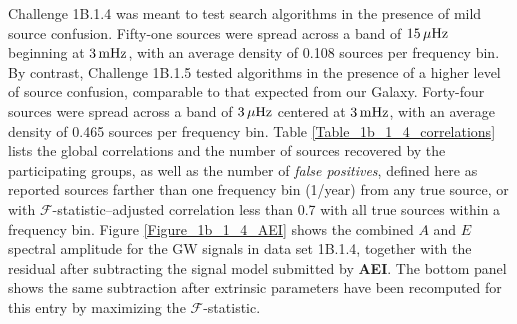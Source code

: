 \documentclass{iopart}
\begin{document}
Challenge 1B.1.4 was meant to test search algorithms in the presence of mild source confusion. Fifty-one sources were spread across a band of $15\, \mu{\rm Hz}$ beginning at $3\, {\rm mHz}$, with an average density of 0.108 sources per frequency bin. By contrast, Challenge 1B.1.5 tested algorithms in the presence of a higher level of source confusion, comparable to that expected from our Galaxy. Forty-four sources were spread across a band of $3\, \mu{\rm Hz}$ centered at $3\, {\rm mHz}$, with an average density of 0.465 sources per frequency bin. Table \ref{Table_1b_1_4_correlations} lists the global correlations and the number of sources recovered by the participating groups, as well as the number of \emph{false positives}, defined here as reported sources farther than one frequency bin (1/year) from any true source, or with $\mathcal{F}$-statistic--adjusted correlation less than 0.7 with all true sources within a frequency bin.
Figure \ref{Figure_1b_1_4_AEI} shows the combined $A$ and $E$ spectral amplitude for the GW signals in data set 1B.1.4, together with the residual after subtracting the signal model submitted by \textbf{AEI}. The bottom panel shows the same subtraction after extrinsic parameters have been recomputed for this entry by maximizing the $\mathcal{F}$-statistic.
\end{document}
